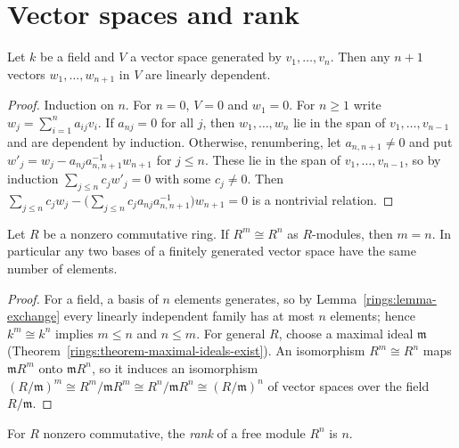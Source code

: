 \section{Vector spaces and rank}\label{rings:section-rank}

\begin{lemma}\label{rings:lemma-exchange}
Let $k$ be a field and $V$ a vector space generated by $v_1, \ldots, v_n$. Then any
$n + 1$ vectors $w_1, \ldots, w_{n+1}$ in $V$ are linearly dependent.
\end{lemma}

\begin{proof}
Induction on $n$. For $n = 0$, $V = 0$ and $w_1 = 0$. For $n \geq 1$ write
$w_j = \sum_{i=1}^n a_{ij} v_i$. If $a_{nj} = 0$ for all $j$, then $w_1, \ldots, w_n$ lie in the
span of $v_1, \ldots, v_{n-1}$ and are dependent by induction. Otherwise, renumbering, let
$a_{n,n+1} \neq 0$ and put $w'_j = w_j - a_{nj}a_{n,n+1}^{-1} w_{n+1}$ for $j \leq n$. These lie in the
span of $v_1, \ldots, v_{n-1}$, so by induction $\sum_{j \leq n} c_j w'_j = 0$ with some $c_j \neq 0$.
Then $\sum_{j \leq n} c_j w_j - \bigl(\sum_{j \leq n} c_j a_{nj} a_{n,n+1}^{-1}\bigr) w_{n+1} = 0$ is a
nontrivial relation.
\end{proof}

\begin{theorem}\label{rings:theorem-rank}
Let $R$ be a nonzero commutative ring. If $R^m \cong R^n$ as $R$-modules, then $m = n$.
In particular any two bases of a finitely generated vector space have the same number
of elements.
\end{theorem}

\begin{proof}
For a field, a basis of $n$ elements generates, so by Lemma~\ref{rings:lemma-exchange}
every linearly independent family has at most $n$ elements; hence $k^m \cong k^n$ implies
$m \leq n$ and $n \leq m$. For general $R$, choose a maximal ideal $\mathfrak{m}$
(Theorem~\ref{rings:theorem-maximal-ideals-exist}). An isomorphism $R^m \cong R^n$ maps
$\mathfrak{m}R^m$ onto $\mathfrak{m}R^n$, so it induces an isomorphism
$(R/\mathfrak{m})^m \cong R^m/\mathfrak{m}R^m \cong R^n/\mathfrak{m}R^n \cong (R/\mathfrak{m})^n$ of vector
spaces over the field $R/\mathfrak{m}$.
\end{proof}

\begin{definition}\label{rings:definition-rank}
For $R$ nonzero commutative, the \emph{rank} of a free module $R^n$ is $n$.
\end{definition}

